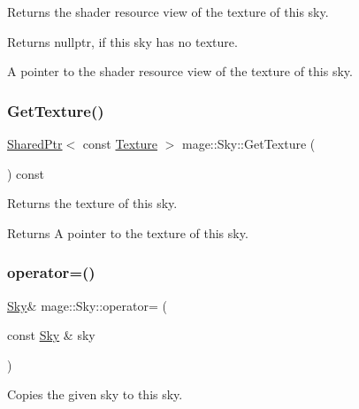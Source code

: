 Returns the shader resource view of the texture of this sky.

\begin{DoxyReturn}{Returns}
{\ttfamily nullptr}, if this sky has no texture. 

A pointer to the shader resource view of the texture of this sky. 
\end{DoxyReturn}
\hypertarget{classmage_1_1_sky_abd49f247b3a376475471310d6396386b}{}\label{classmage_1_1_sky_abd49f247b3a376475471310d6396386b} 
\subsubsection{\texorpdfstring{Get\+Texture()}{GetTexture()}}
{\footnotesize\ttfamily \hyperlink{namespacemage_a1e01ae66713838a7a67d30e44c67703e}{Shared\+Ptr}$<$ const \hyperlink{classmage_1_1_texture}{Texture} $>$ mage\+::\+Sky\+::\+Get\+Texture (\begin{DoxyParamCaption}{ }\end{DoxyParamCaption}) const\hspace{0.3cm}{\ttfamily [noexcept]}}

Returns the texture of this sky.

\begin{DoxyReturn}{Returns}
A pointer to the texture of this sky. 
\end{DoxyReturn}
\hypertarget{classmage_1_1_sky_a1ed7e2e383a87025347ee63b25f0f544}{}\label{classmage_1_1_sky_a1ed7e2e383a87025347ee63b25f0f544} 
\subsubsection{\texorpdfstring{operator=()}{operator=()}\hspace{0.1cm}{\footnotesize\ttfamily [1/2]}}
{\footnotesize\ttfamily \hyperlink{classmage_1_1_sky}{Sky}\& mage\+::\+Sky\+::operator= (\begin{DoxyParamCaption}\item[{const \hyperlink{classmage_1_1_sky}{Sky} \&}]{sky }\end{DoxyParamCaption})\hspace{0.3cm}{\ttfamily [delete]}}

Copies the given sky to this sky.


